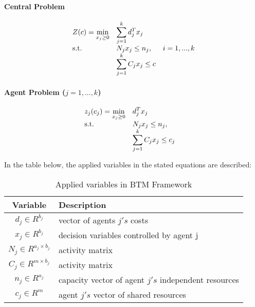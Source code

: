\paragraph*{Central Problem}
\begin{equation}
 \begin{array}{ll@{}ll}
 Z(c) = \underset{x_{j} \geq 0}{\text{min}} & \displaystyle\sum\limits_{j=1}^{k} d^{T}_{j}x_{j} &\\
 \text{s.t.}& \displaystyle N_{j}x_{j} \leq n_{j}, &&i=1 ,..., k \\
 & \displaystyle\sum\limits_{j=1}^{k} C_{j}x_{j} \leq c
 \end{array}
\end{equation}

\paragraph*{Agent Problem ($j=1, ..., k$)}
\begin{equation}
 \begin{array}{ll@{}ll}
 z_{j}(c_{j}) = \underset{x_{j} \geq 0}{\text{min}} & \displaystyle d^{T}_{j}x_{j} &\\
 \text{s.t.}& \displaystyle N_{j}x_{j} \leq n_{j}, &&\\
 & \displaystyle\sum\limits_{j=1}^{k} C_{j}x_{j} \leq c_{j}
 \end{array}
\end{equation}

In the table below, the applied variables in the stated equations are described:


\begin{longtable}{c|l}
    \caption{Applied variables in BTM Framework}
    \label{table:applied_variables_in_btm}
    \\
    \textbf{Variable} & \textbf{Description} \\
	\hline
    $d_{j} \in R^{b_{j}}$ & vector of agents $j's$ costs \\
    $x_{j} \in R^{b_{j}}$ & decision variables controlled by agent j \\
    $N_{j} \in R^{a_{j} \times b_{j}}$ & activity matrix \\
    $C_{j} \in R^{m \times b_{j}}$ & activity matrix \\
    $n_{j} \in R^{a_{j}}$ & capacity vector of agent $j's$ independent resources \\
    $c_{j} \in R^{m}$ & agent $j's$ vector of shared resources \\
\end{longtable} 

